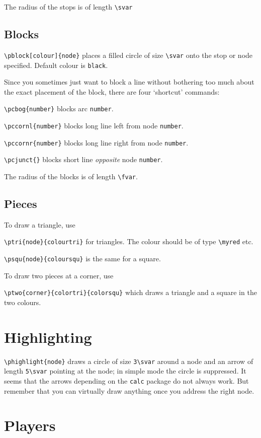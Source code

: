 \documentclass[a5paper]{scrartcl}
\begin{document}
The radius of the stops is of length \verb|\svar|

\subsection*{Blocks}

\verb|\pblock[colour]{node}| places a filled circle of size \verb|\svar| onto the stop or node specified. Default colour is \verb|black|.

Since you sometimes just want to block a line without bothering too much about the exact placement of the block, there are four `shortcut' commands:

\verb|\pcbog{number}| blocks arc \verb|number|.

\verb|\pccornl{number}| blocks long line left from node  \verb|number|.

\verb|\pccornr{number}| blocks long line right from node  \verb|number|.

\verb|\pcjunct{}| blocks short line \emph{opposite} node  \verb|number|.

The radius of the blocks is of length \verb|\fvar|.

\subsection*{Pieces}

To draw a triangle, use

\verb|\ptri{node}{colourtri}| for triangles. The colour should be of type \verb|\myred| etc.

\verb|\psqu{node}{coloursqu}| is the same for a square. 

To draw two pieces at a corner, use

\verb|\ptwo{corner}{colortri}{colorsqu}| which draws a triangle and a square in the two colours.



\section*{Highlighting}

\verb|\phighlight{node}| draws a circle of size \verb|3\svar| around a node and an arrow of length \verb|5\svar| pointing at the node; in simple mode the circle is suppressed. It seems that the arrows depending on the \verb|calc| package do not always work. But remember that you can virtually draw anything once you address the right node.

\section*{Players}
\end{document}
